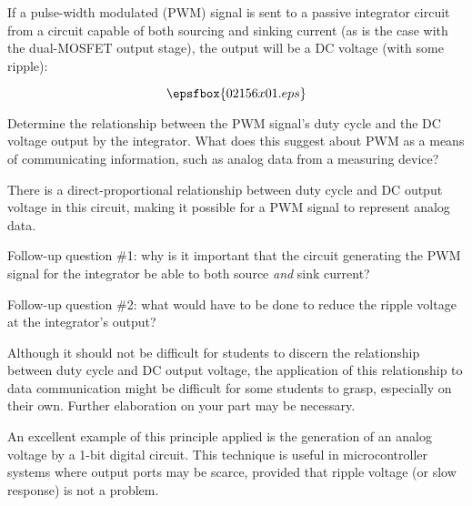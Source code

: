 

If a pulse-width modulated (PWM) signal is sent to a passive integrator circuit from a circuit capable of both sourcing and sinking current (as is the case with the dual-MOSFET output stage), the output will be a DC voltage (with some ripple):

$$\epsfbox{02156x01.eps}$$

Determine the relationship between the PWM signal's duty cycle and the DC voltage output by the integrator.  What does this suggest about PWM as a means of communicating information, such as analog data from a measuring device?







There is a direct-proportional relationship between duty cycle and DC output voltage in this circuit, making it possible for a PWM signal to represent analog data.

\vskip 10pt

Follow-up question \#1: why is it important that the circuit generating the PWM signal for the integrator be able to both source {\it and} sink current?

\vskip 10pt

Follow-up question \#2: what would have to be done to reduce the ripple voltage at the integrator's output?







Although it should not be difficult for students to discern the relationship between duty cycle and DC output voltage, the application of this relationship to data communication might be difficult for some students to grasp, especially on their own.  Further elaboration on your part may be necessary.

An excellent example of this principle applied is the generation of an analog voltage by a 1-bit digital circuit.  This technique is useful in microcontroller systems where output ports may be scarce, provided that ripple voltage (or slow response) is not a problem.




